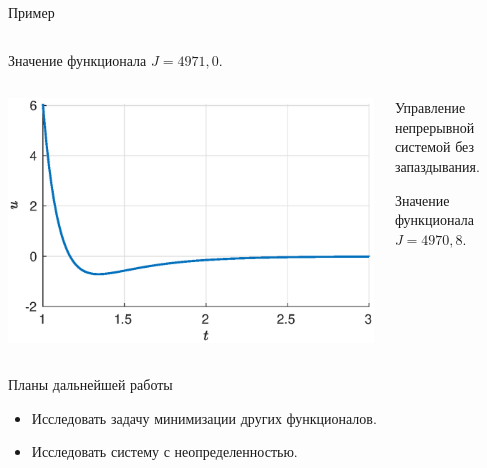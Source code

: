 \begin{frame}{Пример}
\begin{columns}
\begin{column}{0.55\textwidth}
                                Значение функционала $J = 4971,\!0$.
                        \end{column}
                \end{columns}
                \begin{columns}
                        \begin{column}{0.45\textwidth}
                                \includegraphics[width=1.15\textwidth]{content/continuous_task/example/simple-control.eps}
                        \end{column}
                        \begin{column}{0.55\textwidth}
                                Управление непрерывной системой без запаздывания.

                                \vspace{0.2cm}

                                Значение функционала $J = 4970,\!8$.
                        \end{column}
                \end{columns}
        \end{frame}
        \begin{frame}{Планы дальнейшей работы}
                \begin{itemize}
                        \item Исследовать задачу минимизации других функционалов.
                        \item Исследовать систему с неопределенностью.
                \end{itemize}
        \end{frame}
